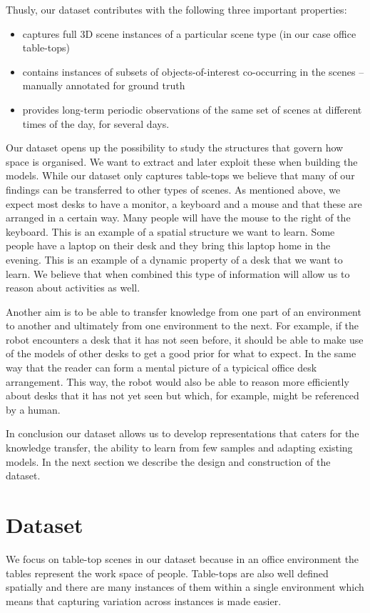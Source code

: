 \documentclass[letterpaper, 10 pt, conference]{ieeeconf}  %
\begin{document}
Thusly, our dataset contributes with the following three important properties:
\begin{itemize}
	\item captures full 3D scene instances of a particular scene type (in our case office table-tops)
	\item contains instances of subsets of objects-of-interest co-occurring in the scenes -- manually annotated for ground truth
	\item provides long-term periodic observations of the same set of scenes at different times of the day, for several days.
\end{itemize}

Our dataset opens up the possibility to study the structures that govern how space is organised. We want to extract and later exploit these 
when building the models. While our dataset only captures table-tops we believe that many of our findings can be transferred to other types 
of scenes. As mentioned above, we expect most desks to have a monitor, a keyboard and a mouse and that these are arranged in a certain way. 
Many people will have the mouse to the right of the keyboard. This is an example of a spatial structure we want to learn. Some people have a 
laptop on their desk and they bring this laptop home in the evening. This is an example of a dynamic property of a desk that we want to 
learn. We believe that when combined this type of information will allow us to reason about activities as well.

Another aim is to be able to transfer knowledge from one part of an
environment to another and ultimately from one environment to the
next. For example, if the robot encounters a desk that it has not seen
before, it should be able to make use of the models of other desks to
get a good prior for what to expect. In the same way that the reader
can form a mental picture of a typicical office desk arrangement.
This way, the robot would also be able to reason more efficiently
about desks that it has not yet seen but which, for example, might be
referenced by a human.

In conclusion our dataset allows us to develop representations that caters for the knowledge transfer, the ability to learn from few samples and adapting existing models. In the next section we describe the design and construction of the dataset.



\section{Dataset}
\label{sec:Dataset}
We focus on table-top scenes in our dataset because in an office environment the tables represent the work space of people. Table-tops are also well defined spatially and there are many instances of them within a single environment which means that capturing variation across instances is made easier.
\end{document}
